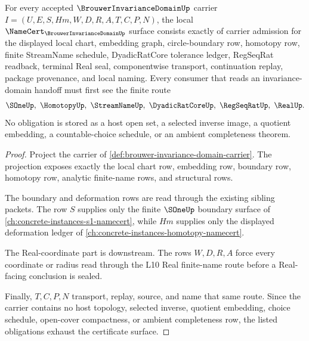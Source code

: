\begin{theorem}
\label{thm:brouwer-invariance-domain-namecert-obligations}
For every accepted $\BrouwerInvarianceDomainUp$ carrier $I=(U,E,S,Hm,W,D,R,A,T,C,P,N)$, the local $\NameCert_{\BrouwerInvarianceDomainUp}$ surface consists exactly of carrier admission for the displayed local chart, embedding graph, circle-boundary row, homotopy row, finite StreamName schedule, DyadicRatCore tolerance ledger, RegSeqRat readback, terminal Real seal, componentwise transport, continuation replay, package provenance, and local naming. Every consumer that reads an invariance-domain handoff must first see the finite route
$$
\SOneUp,\ \HomotopyUp,\ \StreamNameUp,\ \DyadicRatCoreUp,\ \RegSeqRatUp,\ \RealUp .
$$
No obligation is stored as a host open set, a selected inverse image, a quotient embedding, a countable-choice schedule, or an ambient completeness theorem.
\end{theorem}
\begin{proof}
Project the carrier of \autoref{def:brouwer-invariance-domain-carrier}. The projection exposes exactly the local chart row, embedding row, boundary row, homotopy row, analytic finite-name rows, and structural rows.

The boundary and deformation rows are read through the existing sibling packets. The row $S$ supplies only the finite $\SOneUp$ boundary surface of \autoref{ch:concrete-instances-s1-namecert}, while $Hm$ supplies only the displayed deformation ledger of \autoref{ch:concrete-instances-homotopy-namecert}.

The Real-coordinate part is downstream. The rows $W,D,R,A$ force every coordinate or radius read through the L10 Real finite-name route before a Real-facing conclusion is sealed.

Finally, $T,C,P,N$ transport, replay, source, and name that same route. Since the carrier contains no host topology, selected inverse, quotient embedding, choice schedule, open-cover compactness, or ambient completeness row, the listed obligations exhaust the certificate surface.
\end{proof}


